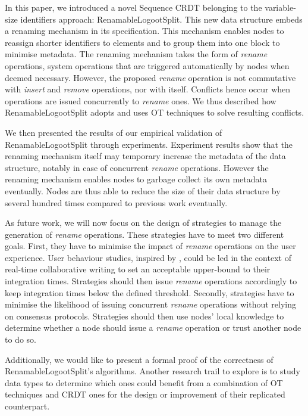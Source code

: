\documentclass[10pt,journal,compsoc]{IEEEtran}
\begin{document}
In this paper, we introduced a novel Sequence \ac{CRDT} belonging to the variable-size identifiers approach: RenamableLogootSplit.
This new data structure embeds a renaming mechanism in its specification.
This mechanism enables nodes to reassign shorter identifiers to elements and to group them into one block to minimise metadata.
The renaming mechanism takes the form of \emph{rename} operations, system operations that are triggered automatically by nodes when deemed necessary.
However, the proposed \emph{rename} operation is not commutative with \emph{insert} and \emph{remove} operations, nor with itself.
Conflicts hence occur when operations are issued concurrently to \emph{rename} ones.
We thus described how RenamableLogootSplit adopts and uses \ac{OT} techniques to solve resulting conflicts.

We then presented the results of our empirical validation of RenamableLogootSplit through experiments.
Experiment results show that the renaming mechanism itself may temporary increase the metadata of the data structure, notably in case of concurrent \emph{rename} operations.
However the renaming mechanism enables nodes to garbage collect its own metadata eventually.
Nodes are thus able to reduce the size of their data structure by several hundred times compared to previous work eventually.

As future work, we will now focus on the design of strategies to manage the generation of \emph{rename} operations.
These strategies have to meet two different goals.
First, they have to minimise the impact of \emph{rename} operations on the user experience.
User behaviour studies, inspired by \cite{ignat:hal-01088815,ignat:hal-01238831}, could be led in the context of real-time collaborative writing to set an acceptable upper-bound to their integration times.
Strategies should then issue \emph{rename} operations accordingly to keep integration times below the defined threshold.
Secondly, strategies have to minimise the likelihood of issuing concurrent \emph{rename} operations without relying on consensus protocols.
Strategies should then use nodes' local knowledge to determine whether a node should issue a \emph{rename} operation or trust another node to do so.

Additionally, we would like to present a formal proof of the correctness of RenamableLogootSplit's algorithms.
Another research trail to explore is to study data types to determine which ones could benefit from a combination of \ac{OT} techniques and \ac{CRDT} ones for the design or improvement of their replicated counterpart.
\end{document}
